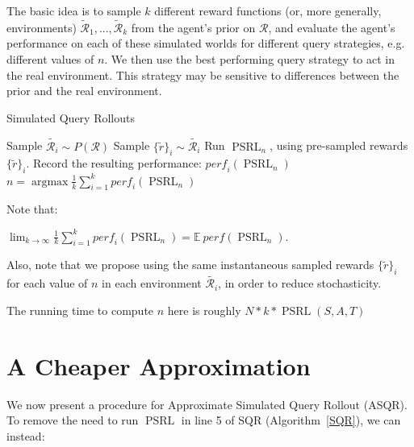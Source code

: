 \documentclass{article}
\begin{document}
The basic idea is to sample $k$ different reward functions (or, more generally, environments) $\mathcal{\tilde{R}}_1, ..., \mathcal{\tilde{R}}_k$ from the agent's prior on $\mathcal{R}$, and evaluate the agent's performance on each of these simulated worlds for different query strategies, e.g. different values of $n$.
We then use the best performing query strategy to act in the real environment.
This strategy may be sensitive to differences between the prior and the real environment.



\begin{algorithm}
\caption{Simulated Query Rollouts}
\label{SQR}
\begin{algorithmic}[1]
	\State Sample $\tilde{\mathcal{R}_i} \sim P(\mathcal{R})$
	\State Sample $\{\tilde{r}\}_i \sim \tilde{\mathcal{R}_i}$
		\State Run $\mathop{PSRL}_n$, using pre-sampled rewards $\{\tilde{r}\}_i$.
		\State Record the resulting performance: $\mathit{perf}_i(\mathop{PSRL}_n)$
	\EndFor
\EndFor
\Return $n = \mathop{\mathrm{argmax}} \frac{1}{k} \sum_{i=1}^k \mathit{perf}_i(\mathop{PSRL}_n)$ 
\end{algorithmic}
\end{algorithm}

Note that:

$
\lim_{k \rightarrow \infty} \frac{1}{k} \sum_{i=1}^k \mathit{perf}_i(\mathop{PSRL}_n) = \mathbb{E} \: \mathit{perf}(\mathop{PSRL}_n).
$

Also, note that we propose using the same instantaneous sampled rewards $\{\tilde{r}\}_i$ for each value of $n$ in each environment $\tilde{\mathcal{R}_i}$, in order to reduce stochasticity.

The running time to compute $n$ here is roughly $N * k * \mathop{PSRL}(S, A, T) $


\section{A Cheaper Approximation}
We now present a procedure for Approximate Simulated Query Rollout (ASQR).
To remove the need to run $\mathop{PSRL}$ in line 5 of SQR (Algorithm~\ref{SQR}), we can instead:
\end{document}
